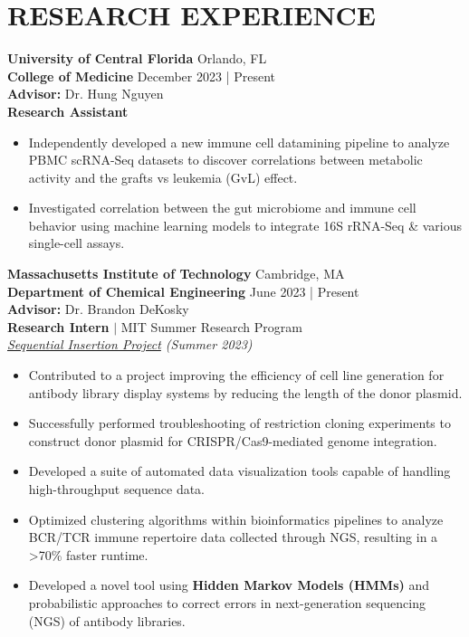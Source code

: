 \documentclass[a4paper,9pt]{extarticle}
\begin{document}
\section*{RESEARCH EXPERIENCE}
\noindent\textbf{University of Central Florida} \hfill Orlando, FL\\ 
\textbf{College of Medicine} \hfill December 2023 | Present \\ 
\textbf{Advisor:} Dr. Hung Nguyen \\
\textbf{Research Assistant}
\begin{itemize}
    \item Independently developed a new immune cell datamining pipeline to analyze PBMC scRNA-Seq datasets to discover correlations between metabolic activity and the grafts vs leukemia (GvL) effect.
    \item Investigated correlation between the gut microbiome and immune cell behavior using machine learning models to integrate 16S rRNA-Seq \& various single-cell assays.
\end{itemize} 
\bigskip

\noindent\textbf{Massachusetts Institute of Technology} \hfill Cambridge, MA\\
\textbf{Department of Chemical Engineering} \hfill June 2023 | Present \\
\textbf{Advisor:} Dr. Brandon DeKosky \\
\textbf{Research Intern} $\vert$ MIT Summer Research Program \\
\textit{\underline{Sequential Insertion Project} (Summer 2023)}
\vspace{2mm}
\begin{itemize}
    \item Contributed to a project improving the efficiency of cell line generation for antibody library display systems by reducing the length of the donor plasmid.
    \item Successfully performed troubleshooting of restriction cloning experiments to construct donor plasmid for CRISPR/Cas9-mediated genome integration.
    \item Developed a suite of automated data visualization tools capable of handling high-throughput sequence data.
    \item Optimized clustering algorithms within bioinformatics pipelines to analyze BCR/TCR immune repertoire data collected through NGS, resulting in a >70\% faster runtime.
    \item Developed a novel tool using \textbf{Hidden Markov Models (HMMs)} and probabilistic approaches to correct errors in next-generation sequencing (NGS) of antibody libraries.
\end{itemize}
\end{document}
